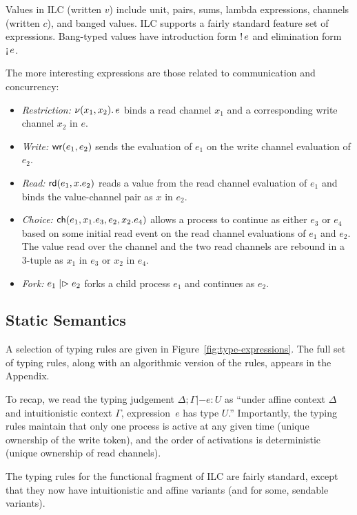 Values in ILC (written $v$) include unit, pairs, sums, lambda expressions,
channels (written $c$), and banged values.  ILC supports a fairly standard
feature set of expressions. Bang-typed values have introduction form ${!}\,{e}$
and elimination form $\textnormal{!`}\,{e}$.

The more interesting expressions are those related to communication and
concurrency:
\begin{itemize}[leftmargin=*]
  \item \emph{Restriction:} $\nu(x_1, x_2).\,e$ binds a read channel $x_1$ and
    a corresponding write channel $x_2$ in $e$.
  \item \emph{Write:} $\textnormal{\textsf{wr}}\mathsf{(}{e_1},{e_2}\mathsf{)}$ sends the evaluation of $e_1$ on
    the write channel evaluation of $e_2$.
  \item \emph{Read:} $\textnormal{\textsf{rd}}\mathsf{(}{e_1},{x}.{e_2}\mathsf{)}$ reads a value from the read channel
    evaluation of $e_1$ and binds the value-channel pair as $x$ in $e_2$.
  \item \emph{Choice:} $\textnormal{\textsf{ch}}\mathsf{(}{e_1},{x_1}.{e_3},{e_2},{x_2}.{e_4}\mathsf{)}$ allows a
    process to continue as either $e_3$ or $e_4$ based on some initial read
    event on the read channel evaluations of $e_1$ and $e_2$. The value read
    over the channel and the two read channels are rebound in a 3-tuple as $x_1$
    in $e_3$ or $x_2$ in $e_4$.
  \item \emph{Fork:} $e_1 \mathrel{|\rhd} e_2$ forks a child process $e_1$ and
    continues as $e_2$.
\end{itemize}

\subsection{Static Semantics}
\label{subsec:types}

A selection of typing rules are given in Figure~\ref{fig:type-expressions}. The
full set of typing rules, along with an algorithmic version of the rules,
appears in the Appendix.

To recap, we read the typing judgement $\Delta; \Gamma |- e : U$ as ``under affine context
$\Delta$ and intuitionistic context $\Gamma$, expression~$e$ has type $U$.'' Importantly,
the typing rules maintain that only one process is active at any given time
(unique ownership of the write token), and the order of activations is
deterministic (unique ownership of read channels).

The typing rules for the functional fragment of ILC are fairly standard, except
that they now have intuitionistic and affine variants (and for some, sendable
variants).

